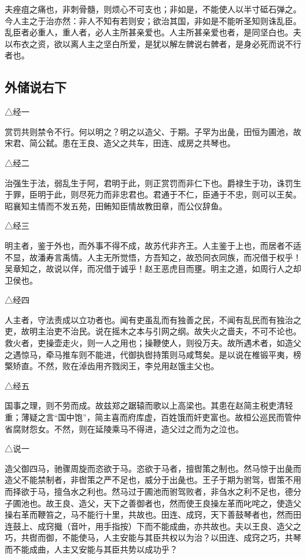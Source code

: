\documentclass[]{article}
\begin{document}
夫痤疽之痛也，非刺骨髓，则烦心不可支也；非如是，不能使人以半寸砥石弹之。今人主之于治亦然：非人不知有若则安；欲治其国，非如是不能听圣知则诛乱臣。乱臣者必重人，重人者，必人主所甚亲爱也。人主所甚亲爱也者，是同坚白也。夫以布衣之资，欲以离人主之坚白所爱，是犹以解左髀说右髀者，是身必死而说不行者也。

\hypertarget{header-n1438}{%
\subsection{外储说右下}\label{header-n1438}}

△经一

赏罚共则禁令不行。何以明之？明之以造父、于期。子罕为出彘，田恒为圃池，故宋君、简公弑。患在王良、造父之共车，田连、成房之共琴也。

△经二

治强生于法，弱乱生于阿，君明于此，则正赏罚而非仁下也。爵禄生于功，诛罚生于罪，臣明于此，则尽死力而非忠君也。君通于不仁，臣通于不忠，则可以王矣。昭襄知主情而不发五苑，田鲔知臣情故教田章，而公仪辞鱼。

△经三

明主者，鉴于外也，而外事不得不成，故苏代非齐王。人主鉴于上也，而居者不适不显，故潘寿言禹情。人主无所觉悟，方吾知之，故恐同衣同族，而况借于权乎！吴章知之，故说以佯，而况借于诚乎！赵王恶虎目而壅。明主之道，如周行人之却卫侯也。

△经四

人主者，守法责成以立功者也。闻有吏虽乱而有独善之民，不闻有乱民而有独治之吏，故明主治吏不治民。说在摇木之本与引网之纲。故失火之啬夫，不可不论也。救火者，吏操壶走火，则一人之用也；操鞭使人，则役万夫。故所遇术者，如造父之遇惊马，牵马推车则不能进，代御执辔持策则马咸骛矣。是以说在椎锻平夷，榜檠矫直。不然，败在淖齿用齐戮闵王，李兑用赵饿主父也。

△经五

国事之理，则不劳而成。故兹郑之踞辕而歌以上高梁也。其患在赵简主税吏清轻重；薄疑之言``国中饱''，简主喜而府库虚，百姓饿而奸吏富也。故桓公巡民而管仲省腐财怨女。不然，则在延陵乘马不得进，造父过之而为之泣也。

△说一

造父御四马，驰骤周旋而恣欲于马。恣欲于马者，擅辔策之制也。然马惊于出彘而造父不能禁制者，非辔策之严不足也，威分于出彘也。王子于期为驸驾，辔策不用而择欲于马，擅刍水之利也。然马过于圃池而驸驾败者，非刍水之利不足也，德分子圃池也。故王良、造父，天下之善御者也，然而使王良操左革而叱咤之，使造父操右革而鞭笞之，马不能行十里，共故也。田连、成窍，天下善鼓琴者也，然而田连鼓上、成窍擑（音叶，用手指按）下而不能成曲，亦共故也。夫以王良、造父之巧，共辔而御，不能使马，人主安能与其臣共权以为治？以田连、成窍之巧，共琴而不能成曲，人主又安能与其臣共势以成功乎？
\end{document}

